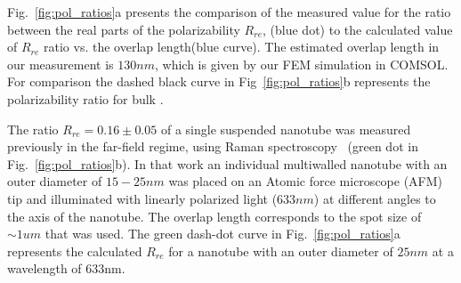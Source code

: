 \documentclass[journal=jacsat,manuscript=article]{achemso}
\begin{document}
Fig.~\ref{fig:pol_ratios}a presents the comparison of the measured value for the ratio between the real parts of the polarizability $R_{re}$, (blue dot) to the calculated value of $R_{re}$ ratio vs. the overlap length(blue curve). The estimated overlap length in our measurement is $130nm$, which is given by our FEM simulation in COMSOL.
For comparison the dashed black curve in Fig~\ref{fig:pol_ratios}b represents the polarizability ratio for bulk .

The ratio $R_{re}=0.16\pm0.05$ of a single suspended nanotube was measured previously in the far-field regime, using Raman spectroscopy~\cite{tenne2005orientation} (green dot in Fig.~\ref{fig:pol_ratios}b). In that work an individual multiwalled  nanotube with an outer diameter of $15-25nm$ was placed on an Atomic force microscope (AFM) tip and illuminated with linearly polarized light ($633nm$) at different angles to the axis of the nanotube. The overlap length corresponds to the spot size of $\sim1um$ that was used.
The green dash-dot curve in Fig.~\ref{fig:pol_ratios}a represents the calculated $R_{re}$ for a nanotube with an outer diameter of $25nm$ at a wavelength of $633$nm.
\end{document}
